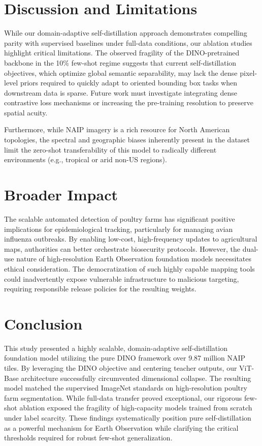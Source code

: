 \section{Discussion and Limitations}
\label{sec:discussion}

While our domain-adaptive self-distillation approach demonstrates compelling parity with supervised baselines under full-data conditions, our ablation studies highlight critical limitations. The observed fragility of the DINO-pretrained backbone in the 10\% few-shot regime suggests that current self-distillation objectives, which optimize global semantic separability, may lack the dense pixel-level priors required to quickly adapt to oriented bounding box tasks when downstream data is sparse. Future work must investigate integrating dense contrastive loss mechanisms or increasing the pre-training resolution to preserve spatial acuity.

Furthermore, while NAIP imagery is a rich resource for North American topologies, the spectral and geographic biases inherently present in the dataset limit the zero-shot transferability of this model to radically different environments (e.g., tropical or arid non-US regions). 

\section{Broader Impact}
The scalable automated detection of poultry farms has significant positive implications for epidemiological tracking, particularly for managing avian influenza outbreaks. By enabling low-cost, high-frequency updates to agricultural maps, authorities can better orchestrate biosecurity protocols. However, the dual-use nature of high-resolution Earth Observation foundation models necessitates ethical consideration. The democratization of such highly capable mapping tools could inadvertently expose vulnerable infrastructure to malicious targeting, requiring responsible release policies for the resulting weights.

\section{Conclusion}
This study presented a highly scalable, domain-adaptive self-distillation foundation model utilizing the pure DINO framework over 9.87 million NAIP tiles. By leveraging the DINO objective and centering teacher outputs, our ViT-Base architecture successfully circumvented dimensional collapse. The resulting model matched the supervised ImageNet standards on high-resolution poultry farm segmentation. While full-data transfer proved exceptional, our rigorous few-shot ablation exposed the fragility of high-capacity models trained from scratch under label scarcity. These findings systematically position pure self-distillation as a powerful mechanism for Earth Observation while clarifying the critical thresholds required for robust few-shot generalization.
